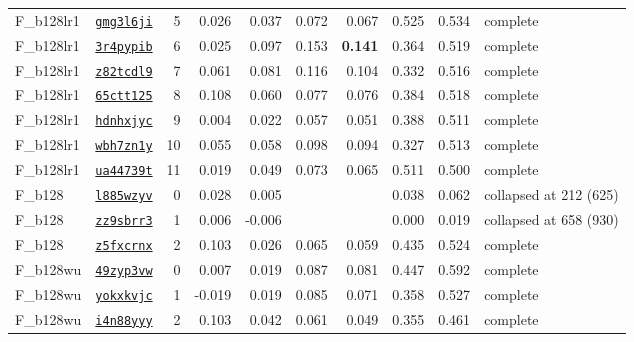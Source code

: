 \begin{tabular}{@{}llrrrrrrrl@{}}
F\_b128lr1 & \href{https://wandb.ai/zhao-group/torchcell_019_expr_v22/runs/gmg3l6ji}{\texttt{gmg3l6ji}} & 5 & 0.026 & 0.037 & 0.072 & 0.067 & 0.525 & 0.534 & complete \\
F\_b128lr1 & \href{https://wandb.ai/zhao-group/torchcell_019_expr_v22/runs/3r4pypib}{\texttt{3r4pypib}} & 6 & 0.025 & 0.097 & 0.153 & \textbf{0.141} & 0.364 & 0.519 & complete \\
F\_b128lr1 & \href{https://wandb.ai/zhao-group/torchcell_019_expr_v22/runs/z82tcdl9}{\texttt{z82tcdl9}} & 7 & 0.061 & 0.081 & 0.116 & 0.104 & 0.332 & 0.516 & complete \\
F\_b128lr1 & \href{https://wandb.ai/zhao-group/torchcell_019_expr_v22/runs/65ctt125}{\texttt{65ctt125}} & 8 & 0.108 & 0.060 & 0.077 & 0.076 & 0.384 & 0.518 & complete \\
F\_b128lr1 & \href{https://wandb.ai/zhao-group/torchcell_019_expr_v22/runs/hdnhxjyc}{\texttt{hdnhxjyc}} & 9 & 0.004 & 0.022 & 0.057 & 0.051 & 0.388 & 0.511 & complete \\
F\_b128lr1 & \href{https://wandb.ai/zhao-group/torchcell_019_expr_v22/runs/wbh7zn1y}{\texttt{wbh7zn1y}} & 10 & 0.055 & 0.058 & 0.098 & 0.094 & 0.327 & 0.513 & complete \\
F\_b128lr1 & \href{https://wandb.ai/zhao-group/torchcell_019_expr_v22/runs/ua44739t}{\texttt{ua44739t}} & 11 & 0.019 & 0.049 & 0.073 & 0.065 & 0.511 & 0.500 & complete \\
\addlinespace
F\_b128 & \href{https://wandb.ai/zhao-group/torchcell_019_expr_v22/runs/l885wzyv}{\texttt{l885wzyv}} & 0 & 0.028 & 0.005 &  &  & 0.038 & 0.062 & collapsed at 212 (625) \\
F\_b128 & \href{https://wandb.ai/zhao-group/torchcell_019_expr_v22/runs/zz9sbrr3}{\texttt{zz9sbrr3}} & 1 & 0.006 & -0.006 &  &  & 0.000 & 0.019 & collapsed at 658 (930) \\
F\_b128 & \href{https://wandb.ai/zhao-group/torchcell_019_expr_v22/runs/z5fxcrnx}{\texttt{z5fxcrnx}} & 2 & 0.103 & 0.026 & 0.065 & 0.059 & 0.435 & 0.524 & complete \\
\addlinespace
F\_b128wu & \href{https://wandb.ai/zhao-group/torchcell_019_expr_v22/runs/49zyp3vw}{\texttt{49zyp3vw}} & 0 & 0.007 & 0.019 & 0.087 & 0.081 & 0.447 & 0.592 & complete \\
F\_b128wu & \href{https://wandb.ai/zhao-group/torchcell_019_expr_v22/runs/yokxkvjc}{\texttt{yokxkvjc}} & 1 & -0.019 & 0.019 & 0.085 & 0.071 & 0.358 & 0.527 & complete \\
F\_b128wu & \href{https://wandb.ai/zhao-group/torchcell_019_expr_v22/runs/i4n88yyy}{\texttt{i4n88yyy}} & 2 & 0.103 & 0.042 & 0.061 & 0.049 & 0.355 & 0.461 & complete \\

\end{tabular}

